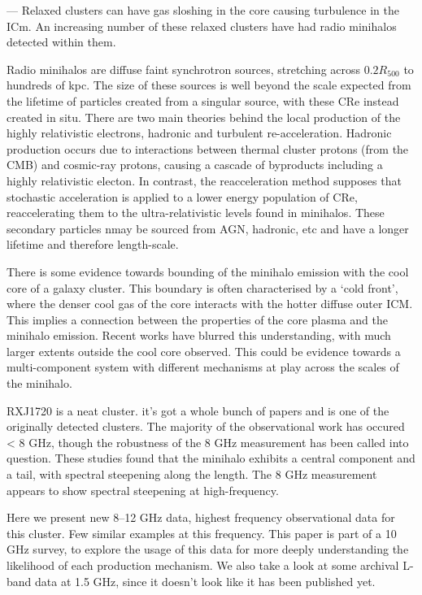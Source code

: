 \documentclass{pas}
\begin{document}
---
Relaxed clusters can have gas sloshing in the core causing turbulence in the ICm. An increasing number of these relaxed clusters have had  radio minihalos detected within them. 

Radio minihalos are diffuse faint synchrotron sources, stretching across $0.2R_{500}$ to hundreds of kpc. The size of these sources is well beyond the scale expected from the lifetime of particles created from a singular source, with these CRe instead created in situ. There are two main theories behind the local production of the highly relativistic electrons, hadronic and turbulent re-acceleration. Hadronic production occurs due to interactions between thermal cluster protons (from the CMB) and cosmic-ray protons, causing a cascade of byproducts including a highly relativistic electon. In contrast, the reacceleration method supposes that stochastic acceleration is applied to a lower energy population of CRe, reaccelerating them to the ultra-relativistic levels found in minihalos. These secondary particles nmay be sourced from AGN, hadronic, etc and have a longer lifetime and therefore length-scale. 

There is some evidence towards bounding of the minihalo emission with the cool core of a galaxy cluster. This boundary is often characterised by a `cold front', where the denser cool gas of the core interacts with the hotter diffuse outer ICM. This implies a connection between the properties of the core plasma and the minihalo emission. Recent works have blurred this understanding, with much larger extents outside the cool core observed. This could be evidence towards a multi-component system with different mechanisms at play across the scales of the minihalo. 

RXJ1720 is a neat cluster. it's got a whole bunch of papers and is one of the originally detected clusters. The majority of the observational work has occured < 8 GHz, though the robustness of the 8 GHz measurement has been called into question. These studies found that the minihalo exhibits a central component and a tail, with spectral steepening along the length. The 8 GHz measurement appears to show spectral steepening at high-frequency. 

Here we present new 8--12 GHz data, highest frequency observational data for this cluster. Few similar examples at this frequency. This paper is part of a 10 GHz survey, to explore the usage of this data for more deeply understanding the likelihood of each production mechanism. We also take a look at some archival L-band data at 1.5 GHz, since it doesn't look like it has been published yet.
\end{document}
